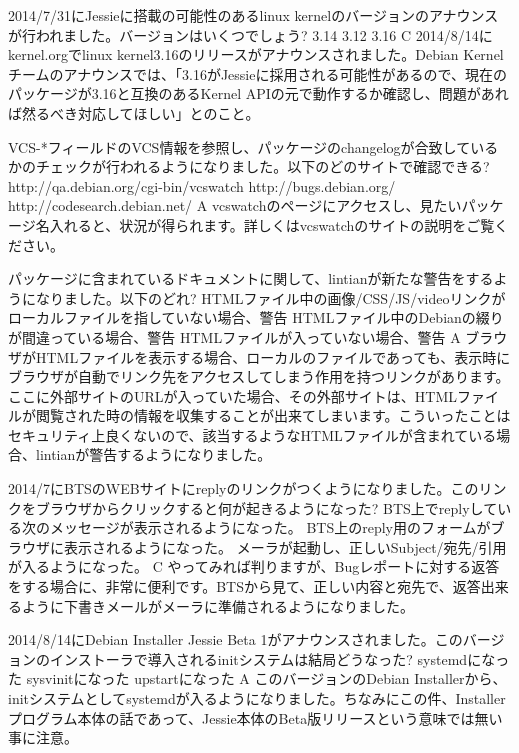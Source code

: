 \santaku
{2014/7/31にJessieに搭載の可能性のあるlinux kernelのバージョンのアナウンスが行われました。バージョンはいくつでしょう?}
{3.14}
{3.12}
{3.16}
{C}
{2014/8/14にkernel.orgでlinux kernel3.16のリリースがアナウンスされました。Debian Kernelチームのアナウンスでは、「3.16がJessieに採用される可能性があるので、現在のパッケージが3.16と互換のあるKernel APIの元で動作するか確認し、問題があれば然るべき対応してほしい」とのこと。}

\santaku
{VCS-*フィールドのVCS情報を参照し、パッケージのchangelogが合致しているかのチェックが行われるようになりました。以下のどのサイトで確認できる?}
{http://qa.debian.org/cgi-bin/vcswatch}
{http://bugs.debian.org/}
{http://codesearch.debian.net/}
{A}
{vcswatchのページにアクセスし、見たいパッケージ名入れると、状況が得られます。詳しくはvcswatchのサイトの説明をご覧ください。}

\santaku
{パッケージに含まれているドキュメントに関して、lintianが新たな警告をするようになりました。以下のどれ?}
{HTMLファイル中の画像/CSS/JS/videoリンクがローカルファイルを指していない場合、警告}
{HTMLファイル中のDebianの綴りが間違っている場合、警告}
{HTMLファイルが入っていない場合、警告}
{A}
{ブラウザがHTMLファイルを表示する場合、ローカルのファイルであっても、表示時にブラウザが自動でリンク先をアクセスしてしまう作用を持つリンクがあります。ここに外部サイトのURLが入っていた場合、その外部サイトは、HTMLファイルが閲覧された時の情報を収集することが出来てしまいます。こういったことはセキュリティ上良くないので、該当するようなHTMLファイルが含まれている場合、lintianが警告するようになりました。}

\santaku
{2014/7にBTSのWEBサイトにreplyのリンクがつくようになりました。このリンクをブラウザからクリックすると何が起きるようになった?}
{BTS上でreplyしている次のメッセージが表示されるようになった。}
{BTS上のreply用のフォームがブラウザに表示されるようになった。}
{メーラが起動し、正しいSubject/宛先/引用が入るようになった。}
{C}
{やってみれば判りますが、Bugレポートに対する返答をする場合に、非常に便利です。BTSから見て、正しい内容と宛先で、返答出来るように下書きメールがメーラに準備されるようになりました。}

\santaku
{2014/8/14にDebian Installer Jessie Beta 1がアナウンスされました。このバージョンのインストーラで導入されるinitシステムは結局どうなった?}
{systemdになった}
{sysvinitになった}
{upstartになった}
{A}
{このバージョンのDebian Installerから、initシステムとしてsystemdが入るようになりました。ちなみにこの件、Installerプログラム本体の話であって、Jessie本体のBeta版リリースという意味では無い事に注意。}
